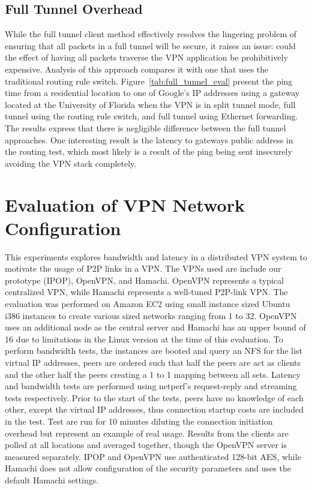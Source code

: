 \subsection{Full Tunnel Overhead}
\label{full_tunnel_eval}
While the full tunnel client method effectively resolves the lingering problem
of ensuring that all packets in a full tunnel will be secure, it raises an
issue:  could the effect of having all packets traverse the VPN application be
prohibitively expensive.  Analysis of this approach compares it with one that
uses the traditional routing rule switch.  Figure~\ref{tab:full_tunnel_eval}
present the ping time from a residential
location to one of Google's IP addresses using a gateway located at the
University of Florida when the VPN is in split tunnel mode, full tunnel using
the routing rule switch, and full tunnel using Ethernet forwarding.  The
results express that there is negligible difference between the full tunnel
approaches.  One interesting result is the latency to gateways public address
in the routing test, which most likely is a result of the ping being sent
insecurely avoiding the VPN stack completely.

\section{Evaluation of VPN Network Configuration}
This experiments explores bandwidth and latency in a distributed VPN system to
motivate the usage of P2P links in a VPN.  The VPNs used are include our
prototype (IPOP), OpenVPN, and Hamachi.  OpenVPN represents a typical
centralized VPN, while Hamachi represents a well-tuned P2P-link VPN.  The
evaluation was performed on Amazon EC2 using small instance sized
Ubuntu i386 instances to create various sized networks ranging from 1 to 32.
OpenVPN uses an additional node as the central server and Hamachi has an upper
bound of 16 due to limitations in the Linux version at the time of this
evaluation.  To perform bandwidth tests, the instances are booted and query an
NFS for the list virtual IP addresses, peers are ordered such that half the
peers are act as clients and the other half the peers creating a 1 to 1 mapping
between all sets.  Latency and bandwidth tests are performed using netperf's
request-reply and streaming tests respectively.  Prior to the start of the
tests, peers have no knowledge of each other, except the virtual IP addresses,
thus connection startup costs are included in the test.  Test are run for 10
minutes diluting the connection initiation overhead but represent an example of
real usage.  Results from the clients are polled at all locations and averaged
together, though the OpenVPN server is measured separately.  IPOP and OpenVPN
use authenticated 128-bit AES, while Hamachi does not allow configuration of
the security parameters and uses the default Hamachi settings.


